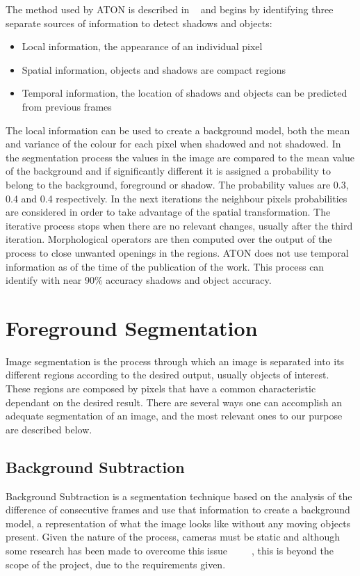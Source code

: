 The method used by ATON is described in ~\cite{mikic_moving_2000} and begins by identifying three separate sources of information to detect shadows and objects:
\begin{itemize}
	\item Local information, the appearance of an individual pixel
	\item Spatial information, objects and shadows are compact regions
	\item Temporal information, the location of shadows and objects can be predicted from previous frames
\end{itemize}

The local information can be used to create a background model, both the mean and variance of the colour for each pixel when shadowed and not shadowed. In the segmentation process the values in the image are compared to the mean value of the background and if significantly different it is assigned a probability to belong to the background, foreground or shadow. The probability values are 0.3, 0.4 and 0.4 respectively. In the next iterations the neighbour pixels probabilities are considered in order to take advantage of the spatial transformation. The iterative process stops when there are no relevant changes, usually after the third iteration. Morphological operators are then computed over the output of the process to close unwanted openings in the regions. ATON does not use temporal information as of the time of the publication of the work. This process can identify with near 90\% accuracy shadows and object accuracy.

\section{Foreground Segmentation}

Image segmentation is the process through which  an image is separated into its different regions according to the desired output, usually objects of interest. These regions are composed by pixels that have a common characteristic ~\cite{shapiro_computer_2001} dependant on the desired result. There are several ways one can accomplish an adequate segmentation of an image, and the most relevant ones to our purpose are described below.

\subsection{Background Subtraction}

Background Subtraction is a segmentation technique based on the analysis of the difference of consecutive frames and use that information to create a background model, a representation of what the image looks like without any moving objects present. Given the nature of the process, cameras must be static and although some research has been made to overcome this issue ~\cite{li_detection_2012} ~\cite{sheikh_background_2009} ~\cite{zamalieva_background_2014}, this is beyond the scope of the project, due to the requirements given.

